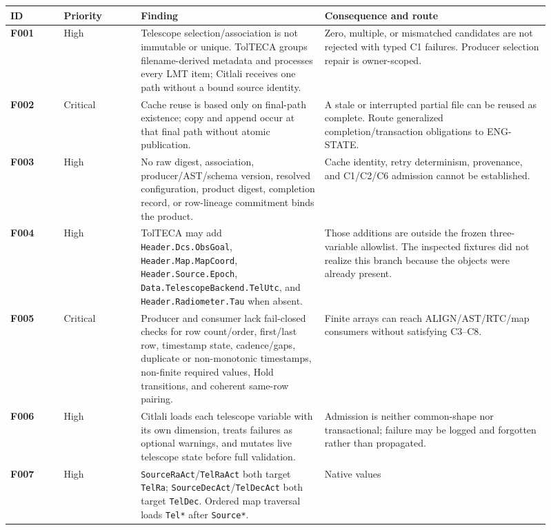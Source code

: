 \documentclass[11pt]{article}
\newcommand{\code}[1]{\texttt{#1}}
\newcommand{\finding}[1]{\textbf{#1}}
\begin{document}
\begin{longtable}{@{}L{0.09\linewidth}L{0.13\linewidth}L{0.31\linewidth}L{0.38\linewidth}@{}}
\toprule
ID & Priority & Finding & Consequence and route \\
\midrule
\endhead
\finding{F001} & High & Telescope selection/association is not immutable or
unique.  TolTECA groups filename-derived metadata and processes every LMT item;
Citlali receives one path without a bound source identity. & Zero, multiple,
or mismatched candidates are not rejected with typed C1 failures.  Producer
selection repair is owner-scoped. \\
\finding{F002} & Critical & Cache reuse is based only on final-path existence;
copy and append occur at that final path without atomic publication. & A stale
or interrupted partial file can be reused as complete.  Route generalized
completion/transaction obligations to ENG-STATE. \\
\finding{F003} & High & No raw digest, association, producer/AST/schema version,
resolved configuration, product digest, completion record, or row-lineage
commitment binds the product. & Cache identity, retry determinism, provenance,
and C1/C2/C6 admission cannot be established. \\
\finding{F004} & High & TolTECA may add \nolinkurl{Header.Dcs.ObsGoal},
\nolinkurl{Header.Map.MapCoord}, \nolinkurl{Header.Source.Epoch},
\nolinkurl{Data.TelescopeBackend.TelUtc}, and
\nolinkurl{Header.Radiometer.Tau} when
absent. & Those additions are outside the frozen three-variable allowlist.
The inspected fixtures did not realize this branch because the objects were
already present. \\
\finding{F005} & Critical & Producer and consumer lack fail-closed checks for
row count/order, first/last row, timestamp state, cadence/gaps, duplicate or
non-monotonic timestamps, non-finite required values, Hold transitions, and
coherent same-row pairing. & Finite arrays can reach ALIGN/AST/RTC/map
consumers without satisfying C3--C8. \\
\finding{F006} & High & Citlali loads each telescope variable with its own
dimension, treats failures as optional warnings, and mutates live telescope
state before full validation. & Admission is neither common-shape nor
transactional; failure may be logged and forgotten rather than propagated. \\
\finding{F007} & High & \code{SourceRaAct}/\code{TelRaAct} both target
\code{TelRa}; \code{SourceDecAct}/\code{TelDecAct} both target \code{TelDec}.
Ordered map traversal loads \code{Tel*} after \code{Source*}. & Native values

\end{longtable}
\end{document}
